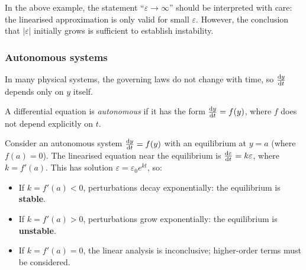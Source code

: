 \documentclass[a4paper]{article}
\begin{document}
\begin{remark}
  In the above example, the statement ``$\varepsilon \to \infty$'' should be interpreted with care: the linearised approximation is only valid for small $\varepsilon$. However, the conclusion that $|\varepsilon|$ initially grows is sufficient to establish instability.
\end{remark}

\subsubsection{Autonomous systems}
\begin{remark}[Motivation]
  In many physical systems, the governing laws do not change with time, so $\frac{\mathrm{d} y}{\mathrm{d} t}$ depends only on $y$ itself.
\end{remark}

\begin{defi}
  A differential equation is \emph{autonomous} if it has the form $\frac{\mathrm{d} y}{\mathrm{d} t} = f(y)$, where $f$ does not depend explicitly on $t$.
\end{defi}

\begin{prop}
  Consider an autonomous system $\frac{\mathrm{d} y}{\mathrm{d} t} = f(y)$ with an equilibrium at $y = a$ (where $f(a) = 0$). The linearised equation near the equilibrium is $\frac{\mathrm{d} \varepsilon}{\mathrm{d} t} = k\varepsilon$, where $k = f'(a)$. This has solution $\varepsilon = \varepsilon_0 e^{kt}$, so:
  \begin{itemize}
    \item If $k = f'(a) < 0$, perturbations decay exponentially: the equilibrium is \textbf{stable}.
    \item If $k = f'(a) > 0$, perturbations grow exponentially: the equilibrium is \textbf{unstable}.
    \item If $k = f'(a) = 0$, the linear analysis is inconclusive; higher-order terms must be considered.
  \end{itemize}
\end{prop}
\end{document}
